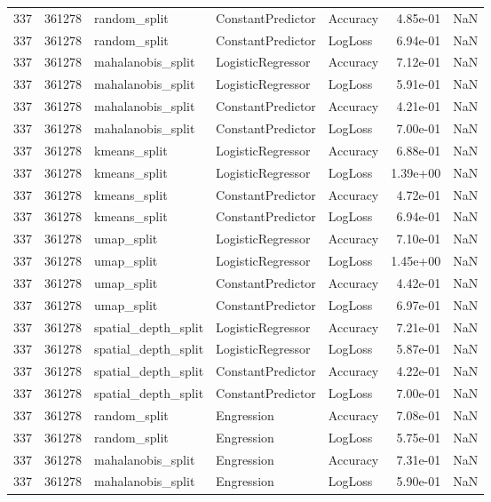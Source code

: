 \begin{tabular}{rrlllrr}
337 & 361278 & random\_split & ConstantPredictor & Accuracy & 4.85e-01 & NaN \\
337 & 361278 & random\_split & ConstantPredictor & LogLoss & 6.94e-01 & NaN \\
337 & 361278 & mahalanobis\_split & LogisticRegressor & Accuracy & 7.12e-01 & NaN \\
337 & 361278 & mahalanobis\_split & LogisticRegressor & LogLoss & 5.91e-01 & NaN \\
337 & 361278 & mahalanobis\_split & ConstantPredictor & Accuracy & 4.21e-01 & NaN \\
337 & 361278 & mahalanobis\_split & ConstantPredictor & LogLoss & 7.00e-01 & NaN \\
337 & 361278 & kmeans\_split & LogisticRegressor & Accuracy & 6.88e-01 & NaN \\
337 & 361278 & kmeans\_split & LogisticRegressor & LogLoss & 1.39e+00 & NaN \\
337 & 361278 & kmeans\_split & ConstantPredictor & Accuracy & 4.72e-01 & NaN \\
337 & 361278 & kmeans\_split & ConstantPredictor & LogLoss & 6.94e-01 & NaN \\
337 & 361278 & umap\_split & LogisticRegressor & Accuracy & 7.10e-01 & NaN \\
337 & 361278 & umap\_split & LogisticRegressor & LogLoss & 1.45e+00 & NaN \\
337 & 361278 & umap\_split & ConstantPredictor & Accuracy & 4.42e-01 & NaN \\
337 & 361278 & umap\_split & ConstantPredictor & LogLoss & 6.97e-01 & NaN \\
337 & 361278 & spatial\_depth\_split & LogisticRegressor & Accuracy & 7.21e-01 & NaN \\
337 & 361278 & spatial\_depth\_split & LogisticRegressor & LogLoss & 5.87e-01 & NaN \\
337 & 361278 & spatial\_depth\_split & ConstantPredictor & Accuracy & 4.22e-01 & NaN \\
337 & 361278 & spatial\_depth\_split & ConstantPredictor & LogLoss & 7.00e-01 & NaN \\
337 & 361278 & random\_split & Engression & Accuracy & 7.08e-01 & NaN \\
337 & 361278 & random\_split & Engression & LogLoss & 5.75e-01 & NaN \\
337 & 361278 & mahalanobis\_split & Engression & Accuracy & 7.31e-01 & NaN \\
337 & 361278 & mahalanobis\_split & Engression & LogLoss & 5.90e-01 & NaN \\

\end{tabular}
